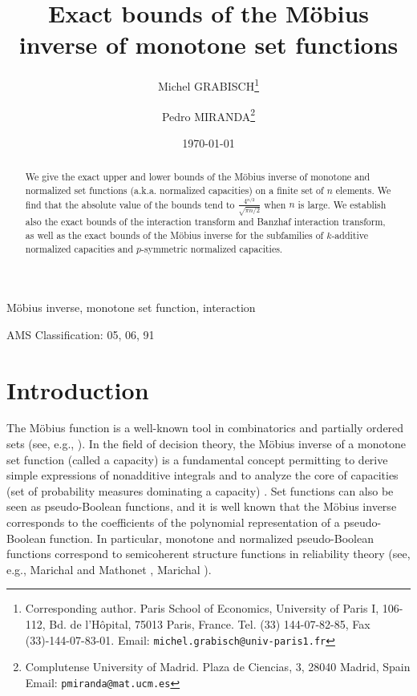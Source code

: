 \documentclass[12pt,a4paper]{article}
\theoremstyle{definition}
\theoremstyle{remark}
\begin{document}
\title{\bf\Large Exact bounds of the M\"obius inverse of monotone set functions}

\author{Michel GRABISCH\thanks{Corresponding author. Paris School of Economics,
          University of Paris I,
         106-112, Bd. de l'H\^opital, 75013 Paris, France. Tel. (33)
        144-07-82-85, Fax (33)-144-07-83-01. Email:
         \texttt{michel.grabisch@univ-paris1.fr}}       \and Pedro
         MIRANDA\thanks{Complutense University of Madrid. Plaza de Ciencias, 3,
           28040 Madrid, Spain Email:
       \texttt{pmiranda@mat.ucm.es}}
}

\date{\today}

\maketitle


\begin{abstract}
We give the exact upper and lower bounds of the M\"obius inverse of monotone and
normalized set functions (a.k.a. normalized capacities) on a finite set of $n$
elements. We find that the absolute value of the bounds tend to
$\frac{4^{n/2}}{\sqrt{\pi n/2}}$ when $n$ is large. We establish also the exact bounds of
the interaction transform and Banzhaf interaction transform, as well as the
exact bounds of the M\"obius inverse for the subfamilies of $k$-additive normalized
capacities and $p$-symmetric normalized capacities.
\end{abstract}


 M\"obius inverse, monotone set function, interaction

\noindent AMS Classification: 05, 06, 91

\section{Introduction}
The M\"obius function is a well-known tool in combinatorics and partially
ordered sets (see, e.g., \cite{aig79,lin97,rot64}). In the field of
decision theory, the M\"obius inverse of a monotone set function (called a
capacity) is a fundamental concept permitting to derive simple expressions of
nonadditive integrals and to analyze the core of capacities (set of probability
measures dominating a capacity) \cite{chja89}. Set functions can also be seen as
pseudo-Boolean functions, and it is well known that the M\"obius inverse
corresponds to the coefficients of the polynomial representation of a
pseudo-Boolean function.  In particular, monotone and normalized
  pseudo-Boolean functions correspond to semicoherent structure functions in
  reliability theory (see, e.g., Marichal and Mathonet \cite{mama13}, Marichal
  \cite{mar14}). 
\end{document}
